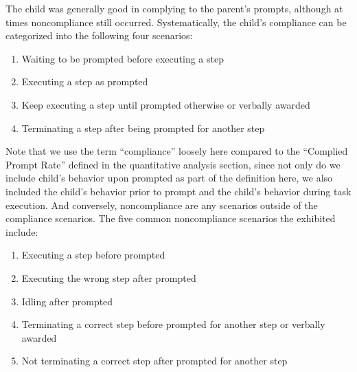 The child was generally good in complying to the parent's prompts, although at times noncompliance still occurred.  Systematically, the child's compliance can be categorized into the following four scenarios:
\begin{enumerate}
	\item Waiting to be prompted before executing a step
	\item Executing a step as prompted
	\item Keep executing a step until prompted otherwise or verbally awarded
	\item Terminating a step after being prompted for another step
\end{enumerate}
Note that we use the term ``compliance'' loosely here compared to the ``Complied Prompt Rate'' defined in the quantitative analysis section, since not only do we include child's behavior upon prompted as part of the definition here, we also included the child's behavior prior to prompt and the child's behavior during task execution.  And conversely, noncompliance are any scenarios outside of the compliance scenarios.  The five common noncompliance scenarios the exhibited include:
\label{List:NoncopmlianceBehaviors}
\begin{enumerate}
	\item Executing a step before prompted
	\item Executing the wrong step after prompted
	\item Idling after prompted
	\item Terminating a correct step before prompted for another step or verbally awarded
	\item Not terminating a correct step after prompted for another step
\end{enumerate}

